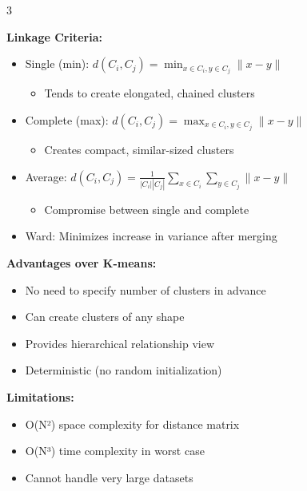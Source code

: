 \documentclass[10pt,landscape]{article}
\begin{document}
\begin{multicols}{3}
\begin{tcolorbox}[breakable, title=5.2 Hierarchical Agglomerative Clustering, colback=clustering]
\textbf{Linkage Criteria:}
\begin{itemize}[leftmargin=*,noitemsep,topsep=0pt]
    \item Single (min): $d(C_i, C_j) = \min_{x \in C_i, y \in C_j} \|x - y\|$
    \begin{itemize}[leftmargin=*,noitemsep]
        \item Tends to create elongated, chained clusters
    \end{itemize}
    \item Complete (max): $d(C_i, C_j) = \max_{x \in C_i, y \in C_j} \|x - y\|$
    \begin{itemize}[leftmargin=*,noitemsep]
        \item Creates compact, similar-sized clusters
    \end{itemize}
    \item Average: $d(C_i, C_j) = \frac{1}{|C_i||C_j|}\sum_{x \in C_i}\sum_{y \in C_j}\|x - y\|$
    \begin{itemize}[leftmargin=*,noitemsep]
        \item Compromise between single and complete
    \end{itemize}
    \item Ward: Minimizes increase in variance after merging
\end{itemize}

\textbf{Advantages over K-means:}
\begin{itemize}[leftmargin=*,noitemsep,topsep=0pt]
    \item No need to specify number of clusters in advance
    \item Can create clusters of any shape
    \item Provides hierarchical relationship view
    \item Deterministic (no random initialization)
\end{itemize}

\textbf{Limitations:}
\begin{itemize}[leftmargin=*,noitemsep,topsep=0pt]
    \item O(N²) space complexity for distance matrix
    \item O(N³) time complexity in worst case
    \item Cannot handle very large datasets
\end{itemize}
\end{tcolorbox}


\end{multicols}
\end{document}
